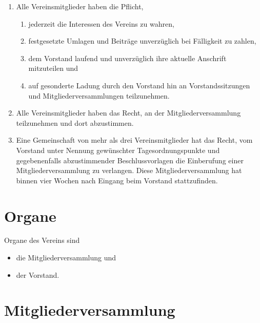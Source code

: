 \documentclass[a4paper, 10pt, headings=normal]{scrartcl}
\begin{document}
\begin{multicols}{2}
\begin{enumerate}[label={(\arabic*)}]
	\item
		Alle Vereinsmitglieder haben die Pflicht,
		\begin{enumerate}[label={\arabic*.}]
			\item
				jederzeit die Interessen des Vereins zu wahren,
			\item
				festgesetzte Umlagen und Beiträge unverzüglich bei Fälligkeit zu zahlen,
			\item
				dem Vorstand laufend und unverzüglich ihre aktuelle Anschrift mitzuteilen und
			\item
				auf gesonderte Ladung durch den Vorstand hin an Vorstandssitzungen und Mitgliederversammlungen teilzunehmen.
		\end{enumerate}
	\item
		Alle Vereinsmitglieder haben das Recht, an der Mitgliederversammlung teilzunehmen und dort abzustimmen.
	\item
		Eine Gemeinschaft von mehr als drei Vereinsmitglieder hat das Recht, vom Vorstand unter Nennung gewünschter Tagesordnungspunkte und gegebenenfalls abzustimmender Beschlussvorlagen die Einberufung einer Mitgliederversammlung zu verlangen.
		Diese Mitgliederversammlung hat binnen vier Wochen nach Eingang beim Vorstand stattzufinden.
\end{enumerate}

\section{Organe}
\label{par:organe}

Organe des Vereins sind
\begin{itemize}[label={–}]
	\item
		die Mitgliederversammlung und
	\item
		der Vorstand.
\end{itemize}

\section{Mitgliederversammlung}
\label{par:mitgliederversammlung}


\end{multicols}
\end{document}
